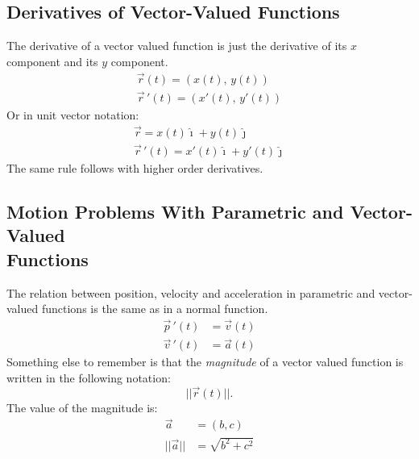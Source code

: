 \documentclass[12pt]{article}
\begin{document}
\subsection{Derivatives of Vector-Valued Functions}
The derivative of a vector valued function is just the derivative of its $x$ component and its $y$ component.
\begin{gather*}
    \vec{r}(t) = \left( x(t), \, y(t) \right) \\
    \vec{r} \, '(t) = \left( x'(t), \, y'(t) \right)
\end{gather*}
Or in unit vector notation:
\begin{gather*}
    \vec{r} = x(t) \hat{\imath} + y(t) \hat{\jmath} \\
    \vec{r} \, '(t) = x'(t) \hat{\imath} + y'(t) \hat{\jmath}
\end{gather*}
The same rule follows with higher order derivatives.

\subsection[Motion Problems With Parametric and Vector-Valued Functions]{Motion Problems With Parametric and Vector-Valued\\Functions}
The relation between position, velocity and acceleration in parametric and vector-valued functions is the same as in a normal function.
\begin{align*}
    \vec{p} \, '(t) & = \vec{v}(t) \\
    \vec{v} \, '(t) & = \vec{a}(t)
\end{align*}
Something else to remember is that the \textit{magnitude} of a vector valued function is written in the following notation:
\[ || \vec{r}(t) ||. \]
The value of the magnitude is:
\begin{align*}
    \vec{a}       & = (b, c)           \\
    || \vec{a} || & = \sqrt{b^2 + c^2}
\end{align*}
\end{document}
